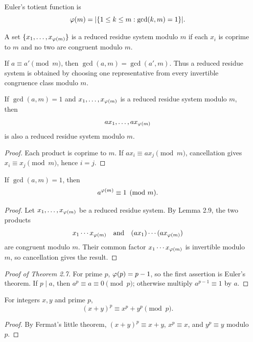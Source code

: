 \begin{de}
Euler's totient function is
\[
 \totient(m)=\abs*{\{1\le k\le m:\gcd(k,m)=1\}}.
\]
\end{de}

\begin{de}
A set $\{x_1,\ldots,x_{\varphi(m)}\}$ is a reduced residue system modulo $m$ if each $x_i$ is coprime to $m$ and no two are congruent modulo $m$.
\end{de}

\begin{remark}
If $a\equiv a'\pmod m$, then $\gcd(a,m)=\gcd(a',m)$.  Thus a reduced residue system is obtained by choosing one representative from every invertible congruence class modulo $m$.
\end{remark}

\begin{lem}
If $\gcd(a,m)=1$ and $x_1,\ldots,x_{\varphi(m)}$ is a reduced residue system modulo $m$, then
\[
 ax_1,\ldots,ax_{\varphi(m)}
\]
is also a reduced residue system modulo $m$.
\end{lem}
\begin{proof}
Each product is coprime to $m$.  If $ax_i\equiv ax_j\pmod m$, cancellation gives $x_i\equiv x_j\pmod m$, hence $i=j$.
\end{proof}

\begin{thm}
If $\gcd(a,m)=1$, then
\[
 a^{\varphi(m)}\equiv1\pmod m.
\]
\end{thm}
\begin{proof}
Let $x_1,\ldots,x_{\varphi(m)}$ be a reduced residue system.  By Lemma 2.9, the two products
\[
 x_1\cdots x_{\varphi(m)}
 \quad\text{and}\quad
 (ax_1)\cdots(ax_{\varphi(m)})
\]
are congruent modulo $m$.  Their common factor $x_1\cdots x_{\varphi(m)}$ is invertible modulo $m$, so cancellation gives the result.
\end{proof}

\begin{proof}[Proof of Theorem 2.7]
For prime $p$, $\varphi(p)=p-1$, so the first assertion is Euler's theorem.  If $p\mid a$, then $a^p\equiv a\equiv0\pmod p$; otherwise multiply $a^{p-1}\equiv1$ by $a$.
\end{proof}

\begin{thm}
For integers $x,y$ and prime $p$,
\[
 (x+y)^p\equiv x^p+y^p\pmod p.
\]
\end{thm}
\begin{proof}
By Fermat's little theorem, $(x+y)^p\equiv x+y$, $x^p\equiv x$, and $y^p\equiv y$ modulo $p$.
\end{proof}

